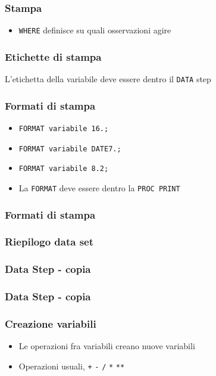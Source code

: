 \begin{frame}[containsverbatim]\frametitle{Stampa}
  \begin{itemize}
  \item
    \verb+WHERE+ definisce su quali osservazioni agire
  \end{itemize}\end{frame}

\begin{frame}[containsverbatim]\frametitle{Etichette di stampa}

  \vspace{1em}
  L'etichetta della variabile deve essere dentro il \verb!DATA! step
\end{frame}




\begin{frame}[containsverbatim]\frametitle{Formati di stampa}
  \begin{itemize}
  \item
    \verb!FORMAT variabile 16.;!
  \item
    \verb!FORMAT variabile DATE7.;!
  \item
    \verb!FORMAT variabile 8.2;!
  \item
    La \verb!FORMAT! deve essere dentro la \verb!PROC PRINT!
  \end{itemize}
\end{frame}

\begin{frame}[containsverbatim]\frametitle{Formati di stampa}
\end{frame}


\begin{frame}[containsverbatim]\frametitle{Riepilogo data set}
\end{frame}



\begin{frame}[fragile]\frametitle{Data Step - copia }
\end{frame}



\begin{frame}[fragile]\frametitle{Data Step - copia }
\end{frame}



\begin{frame}[fragile]\frametitle{Creazione variabili}

  \begin{itemize}
  \item
    Le operazioni fra variabili creano nuove variabili
  \item
    Operazioni usuali, \verb!+! \verb!-! \verb!/! \verb!*! \verb!**!
  \end{itemize}
\end{frame}




